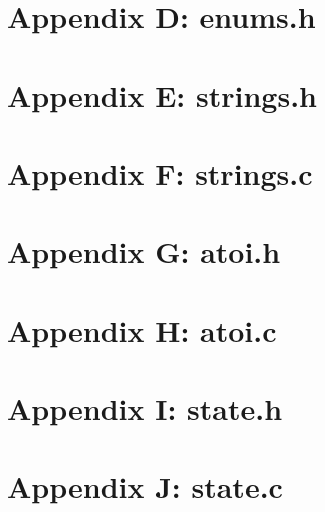 \documentclass[letterpaper,11pt]{texMemo} %
\begin{document}
\section*{Appendix D: enums.h}
\begin{tiny}

\end{tiny}
\newpage
\section*{Appendix E: strings.h}
\begin{tiny}

\end{tiny}
\section*{Appendix F: strings.c}
\begin{tiny}

\end{tiny}
\section*{Appendix G: atoi.h}
\begin{tiny}

\end{tiny}
\section*{Appendix H: atoi.c}
\begin{tiny}

\end{tiny}
\section*{Appendix I: state.h}
\begin{tiny}

\end{tiny}
\section*{Appendix J: state.c}
\begin{tiny}

\end{tiny}
\end{document}
